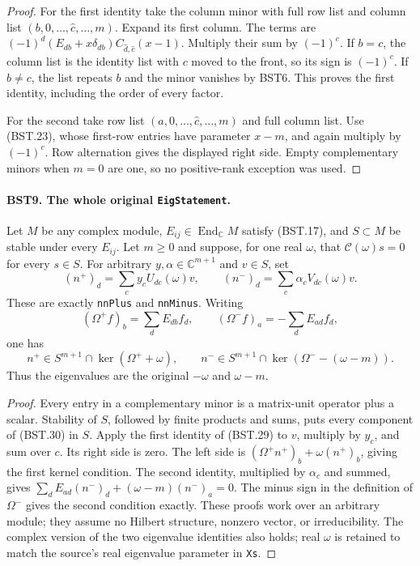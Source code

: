\begin{proof}
For the first identity take the column minor with full row list and
column list $(b,0,\ldots,\widehat c,\ldots,m)$.
Expand its first column.  The terms are
$(-1)^d(E_{db}+x\delta_{db})
C_{\widehat d,\widehat c}(x-1)$.
Multiply their sum by $(-1)^c$.  If $b=c$, the column list is
the identity list with $c$ moved to the front, so its sign is
$(-1)^c$.  If $b\ne c$, the list repeats $b$ and the minor
vanishes by BST6.  This proves the first identity, including the
order of every factor.

For the second take row list $(a,0,\ldots,\widehat c,\ldots,m)$
and full column list.  Use (BST.23), whose first-row entries
have parameter $x-m$, and again multiply by $(-1)^c$.
Row alternation gives the displayed right side.  Empty complementary
minors when $m=0$ are one, so no positive-rank exception was used.
\end{proof}

\paragraph{BST9. The whole original \texttt{EigStatement}.}
\label{claim:BST9}
Let $M$ be any complex module, $E_{ij}\in\operatorname{End}_{\mathbb C}M$
satisfy (BST.17), and $S\subset M$ be stable under every $E_{ij}$.
Let $m\ge0$ and suppose, for one real $\omega$, that
$\mathcal C(\omega)s=0$ for every $s\in S$.
For arbitrary $y,\alpha\in\mathbb C^{m+1}$ and $v\in S$, set
\[
 (n^+)_d=\sum_c y_cU_{dc}(\omega)v,\qquad
 (n^-)_d=\sum_c \alpha_cV_{dc}(\omega)v.
 \tag{BST.30}
\]
These are exactly \texttt{nnPlus} and \texttt{nnMinus}.
Writing
\[
 (\Omega^+f)_b=\sum_d E_{db}f_d,\qquad
 (\Omega^-f)_a=-\sum_d E_{ad}f_d,
 \tag{BST.31}
\]
one has
\[
 n^+\in S^{m+1}\cap\ker(\Omega^++\omega),\qquad
 n^-\in S^{m+1}\cap\ker(\Omega^--(\omega-m)).
 \tag{BST.32}
\]
Thus the eigenvalues are the original $-\omega$ and $\omega-m$.

\begin{proof}
Every entry in a complementary minor is a matrix-unit operator plus
a scalar.  Stability of $S$, followed by finite products and sums,
puts every component of (BST.30) in $S$.
Apply the first identity of (BST.29) to $v$, multiply by $y_c$,
and sum over $c$.  Its right side is zero.  The left side is
$(\Omega^+n^+)_b+\omega(n^+)_b$, giving the first kernel condition.
The second identity, multiplied by $\alpha_c$ and summed, gives
$\sum_dE_{ad}(n^-)_d+(\omega-m)(n^-)_a=0$.
The minus sign in the definition of $\Omega^-$ gives the second
condition exactly.  These proofs work over an arbitrary module;
they assume no Hilbert structure, nonzero vector, or irreducibility.
The complex version of the two eigenvalue identities also holds;
real $\omega$ is retained to match the source's real eigenvalue
parameter in \texttt{Xs}.
\end{proof}

